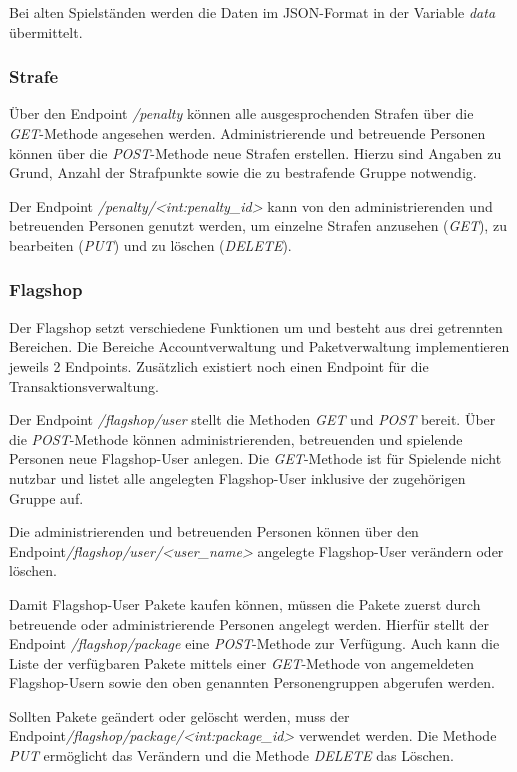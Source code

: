 Bei alten Spielständen werden die Daten im JSON-Format in der Variable \textit{data} übermittelt.

\subsubsection{Strafe}
Über den Endpoint \textit{/penalty} können alle ausgesprochenden Strafen über die \textit{GET}-Methode angesehen werden. Administrierende und betreuende Personen können über die \textit{POST}-Methode neue Strafen erstellen. Hierzu sind Angaben zu Grund, Anzahl der Strafpunkte sowie die zu bestrafende Gruppe notwendig.

Der Endpoint \textit{/penalty/<int:penalty\_id>} kann von den administrierenden und betreuenden Personen genutzt werden, um einzelne Strafen anzusehen (\textit{GET}), zu bearbeiten (\textit{PUT}) und zu löschen (\textit{DELETE}).

\subsubsection{Flagshop}
Der Flagshop setzt verschiedene Funktionen um und besteht aus drei getrennten Bereichen. Die Bereiche Accountverwaltung und Paketverwaltung implementieren jeweils 2 Endpoints. Zusätzlich existiert noch einen Endpoint für die Transaktionsverwaltung. 

Der Endpoint \textit{/flagshop/user} stellt die Methoden \textit{GET} und \textit{POST} bereit. Über die \textit{POST}-Methode können administrierenden, betreuenden und spielende Personen neue Flagshop-User anlegen. Die \textit{GET}-Methode ist für Spielende nicht nutzbar und listet alle angelegten Flagshop-User inklusive der zugehörigen Gruppe auf.

Die administrierenden und betreuenden Personen können über den Endpoint\linebreak \textit{/flagshop/user/<user\_name>} angelegte Flagshop-User verändern oder löschen.

Damit Flagshop-User Pakete kaufen können, müssen die Pakete zuerst durch betreuende oder administrierende Personen angelegt werden. Hierfür stellt der Endpoint \textit{/flagshop/package} eine \textit{POST}-Methode zur Verfügung. Auch kann die Liste der verfügbaren Pakete mittels einer \textit{GET}-Methode von angemeldeten Flagshop-Usern sowie den oben genannten Personengruppen abgerufen werden.

Sollten Pakete geändert oder gelöscht werden, muss der Endpoint\linebreak \textit{/flagshop/package/<int:package\_id>} verwendet werden. Die Methode \textit{PUT} ermöglicht das Verändern und die Methode \textit{DELETE} das Löschen.

